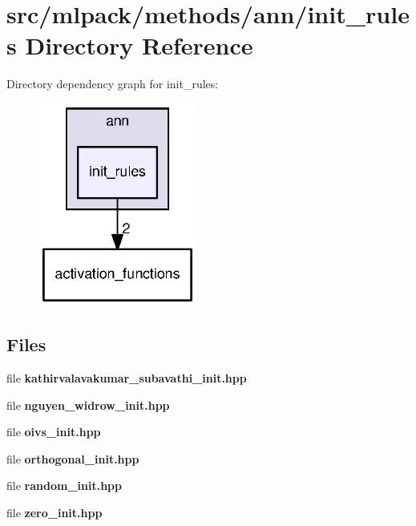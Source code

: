\section{src/mlpack/methods/ann/init\+\_\+rules Directory Reference}
\label{dir_b52cc5b391c1a60ddf624b13b597843f}
Directory dependency graph for init\+\_\+rules\+:
\nopagebreak
\begin{figure}[H]
\begin{center}
\leavevmode
\includegraphics[width=148pt]{dir_b52cc5b391c1a60ddf624b13b597843f_dep}
\end{center}
\end{figure}
\subsection*{Files}
\begin{DoxyCompactItemize}
\item 
file {\bf kathirvalavakumar\+\_\+subavathi\+\_\+init.\+hpp}
\item 
file {\bf nguyen\+\_\+widrow\+\_\+init.\+hpp}
\item 
file {\bf oivs\+\_\+init.\+hpp}
\item 
file {\bf orthogonal\+\_\+init.\+hpp}
\item 
file {\bf random\+\_\+init.\+hpp}
\item 
file {\bf zero\+\_\+init.\+hpp}
\end{DoxyCompactItemize}
